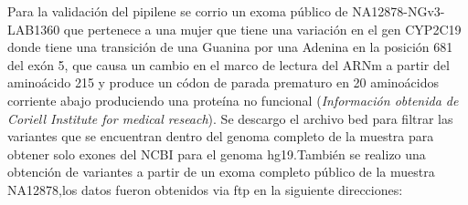 Para la validación del pipilene se corrio un exoma público de  NA12878-NGv3-LAB1360 que pertenece a una mujer que tiene una variación en el gen CYP2C19 donde tiene una transición de una Guanina por una Adenina en la posición 681 del exón 5, que causa un cambio en el marco de lectura del ARNm a partir del aminoácido 215 y produce un códon de parada prematuro en 20 aminoácidos corriente abajo produciendo una proteína no funcional (\textit{Información obtenida de Coriell Institute for medical reseach}). Se descargo el archivo bed para filtrar las variantes que se encuentran dentro del genoma completo de la muestra para obtener solo exones del NCBI para el genoma hg19.También se realizo una obtención de variantes a partir de un exoma completo público de la muestra NA12878,los datos fueron obtenidos via ftp en la siguiente direcciones:\\
\\
